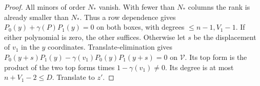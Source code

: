 \begin{proof}
All minors of order $N_*$ vanish. With fewer than $N_*$ columns the rank is
already smaller than $N_*$. Thus a row dependence gives $P_0(y)+\gamma(P)P_1(y)=0$ on both boxes,
with degrees $\le n-1,V_1-1$. If either polynomial is zero, the other suffices.
Otherwise let $s$ be the displacement of $v_1$ in the $y$ coordinates.
Translate-elimination \cite[proof of Proposition~7.1, rank argument]{Z29}
gives $P_0(y+s)P_1(y)-\gamma(v_1)P_0(y)P_1(y+s)=0$ on $\mathcal V$.
Its top form is the product of the two top forms times $1-\gamma(v_1)\ne0$.
Its degree is at most $n+V_1-2\le D$. Translate to $z'$.
\end{proof}
